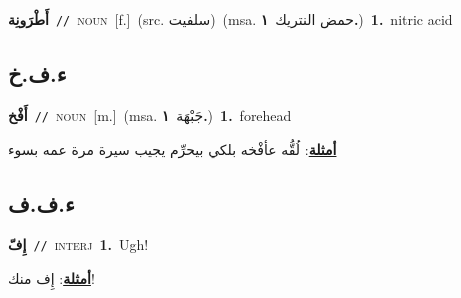 \documentclass[10pt,a4paper,twoside]{article} %
\begin{document}
\begin{multicols}{2}
{\setlength\topsep{0pt}\textbf{\foreignlanguage{arabic}{أَطْرَونِة}}\ {\color{gray}\texttt{//}\color{black}}\ \textsc{noun}\ [f.]\ (src. \color{gray}\foreignlanguage{arabic}{سلفيت}\color{black})\ \color{gray}(msa. \foreignlanguage{arabic}{حمض النتريك}~\foreignlanguage{arabic}{\textbf{١.}})\color{black}\ \textbf{1.}~nitric acid\ } \vspace{2mm}

\vspace{-3mm}
\subsection*{\color{blue}\foreignlanguage{arabic}{ء.ف.خ}\color{blue}{ (ntws)}} 

{\setlength\topsep{0pt}\textbf{\foreignlanguage{arabic}{أَفْخ}}\ {\color{gray}\texttt{//}\color{black}}\ \textsc{noun}\ [m.]\ \color{gray}(msa. \foreignlanguage{arabic}{جَبْهَة}~\foreignlanguage{arabic}{\textbf{١.}})\color{black}\ \textbf{1.}~forehead\  \begin{flushright}\color{gray}\foreignlanguage{arabic}{\textbf{\underline{\foreignlanguage{arabic}{أمثلة}}}: لُقُّه عأفْخه بلكي بيحرِّم يجيب سيرة مرة عمه بسوء}\end{flushright}\color{black}} \vspace{2mm}

\vspace{-3mm}
\subsection*{\color{blue}\foreignlanguage{arabic}{ء.ف.ف}\color{blue}{}} 

{\setlength\topsep{0pt}\textbf{\foreignlanguage{arabic}{إِفّ}}\ {\color{gray}\texttt{//}\color{black}}\ \textsc{interj}\ \textbf{1.}~Ugh!\  \begin{flushright}\color{gray}\foreignlanguage{arabic}{\textbf{\underline{\foreignlanguage{arabic}{أمثلة}}}: إِف منك!}\end{flushright}\color{black}} \vspace{2mm}


\end{multicols}
\end{document}
